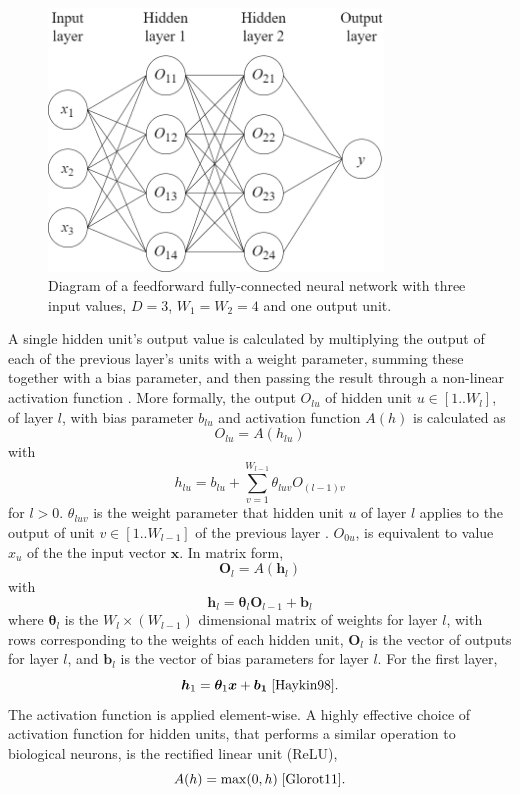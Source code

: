 \documentclass[12pt]{article}
\begin{document}
\begin{figure}[h]
\centering
\includegraphics[width=3.5in]{images/feedforward_nn.png}
\caption{Diagram of a feedforward fully-connected neural network with three input values, $D=3$, $W_1=W_2=4$ and one output unit.}
\end{figure}

A single hidden unit's output value is calculated by multiplying the output of each of the previous layer's units with a weight parameter, summing these together with a bias parameter, and then passing the result through a non-linear activation function \cite{Rumelhart86}. More formally, the output $O_{lu}$ of hidden unit $u\in[1..W_l]$, of layer $l$, with bias parameter $b_{lu}$ and activation function $A(h)$ is calculated as
\begin{equation}
O_{lu}=A(h_{lu})
\end{equation}
with
\begin{equation}
h_{lu}=b_{lu}+\sum_{v=1}^{W_{l-1}}\theta_{luv}O_{(l-1)v}
\end{equation}
for $l > 0$. $\theta_{luv}$ is the weight parameter that hidden unit $u$ of layer $l$ applies to the output of unit $v\in[1..W_{l-1}]$ of the previous layer \cite{Haykin98}. $O_{0u}$, is equivalent to value $x_u$ of the the input vector $\bm{x}$. In matrix form,
\begin{equation}
\bm{O}_l=A(\bm{h}_l)
\end{equation}
with
\begin{equation}
\bm{h}_l=\boldsymbol\theta_l\bm{O}_{l-1}+\bm{b}_l
\end{equation}
where $\boldsymbol\theta_l$ is the $W_l \times \left(W_{l-1}\right)$ dimensional matrix of weights for layer $l$, with rows corresponding to the weights of each hidden unit, $\bm{O}_l$ is the vector of outputs for layer $l$, and $\bm{b}_l$ is the vector of bias parameters for layer $l$. For the first layer,
\begin{equation}
\bm{h}_1=\boldsymbol\theta_1\bm{x}+\bm{b_1}\; \cite{Haykin98}.
\end{equation}
The activation function is applied element-wise. A highly effective choice of activation function for hidden units, that performs a similar operation to biological neurons, is the rectified linear unit (ReLU),
\begin{equation}
A(h)=\mathrm{max}(0,h)\; \cite{Glorot11}.
\end{equation}
\end{document}
